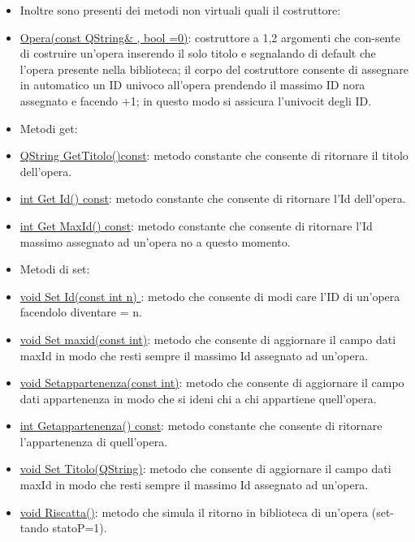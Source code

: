 \documentclass[10pt]{article}
\begin{document}
\begin{itemize}
\item Inoltre sono presenti dei metodi non virtuali quali il costruttore:

		\item \underline{Opera(const QString\& , bool =0)}: costruttore a 1,2 argomenti che con-sente di costruire un'opera inserendo il solo titolo e 			segnalando di default che l'opera presente nella biblioteca; il corpo del costruttore consente di assegnare in automatico un ID univoco all'opera 				prendendo il massimo ID nora assegnato e facendo +1; in questo modo si assicura l'univocit degli ID.

\item Metodi get:

		\item \underline{QString GetTitolo()const}: metodo constante che consente di ritornare il titolo dell'opera.

		\item \underline{int Get Id() const}: metodo constante che consente di ritornare l'Id dell'opera.

		\item \underline{int Get MaxId() const}: metodo constante che consente di ritornare l'Id massimo assegnato ad un'opera no a questo momento.

\item Metodi di set:

		\item \underline{void Set Id(const int n) }: metodo che consente di modi care l'ID di un'opera
		facendolo diventare = n.

		\item \underline{void Set maxid(const int)}:  metodo che consente di aggiornare il campo dati maxId in modo che resti sempre il massimo Id 				assegnato ad un'opera.

		\item \underline{void Setappartenenza(const int)}: metodo che consente di aggiornare il campo dati appartenenza in modo che si ideni chi a chi 			appartiene quell'opera.

		\item \underline{int Getappartenenza() const}: metodo constante che consente di ritornare l'appartenenza di quell'opera.

		\item \underline{void Set Titolo(QString)}: metodo che consente di aggiornare il campo dati maxId in modo che resti sempre il massimo Id 				assegnato ad un'opera.

		\item \underline{void Riscatta()}: metodo che simula il ritorno in biblioteca di un'opera (set-tando statoP=1).


\end{itemize}
\end{document}

